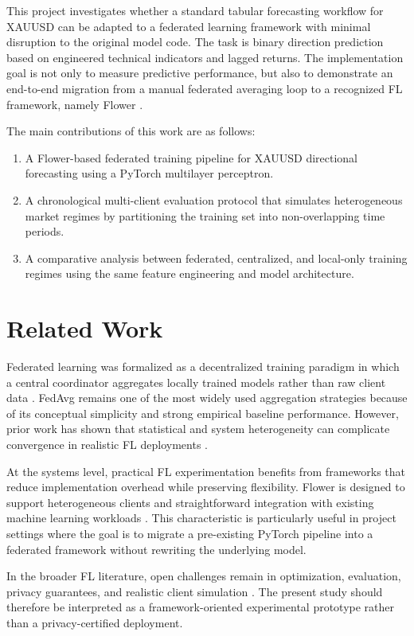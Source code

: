 \documentclass[conference]{IEEEtran}
\begin{document}
This project investigates whether a standard tabular forecasting workflow for XAUUSD can be adapted to a federated learning framework with minimal disruption to the original model code. The task is binary direction prediction based on engineered technical indicators and lagged returns. The implementation goal is not only to measure predictive performance, but also to demonstrate an end-to-end migration from a manual federated averaging loop to a recognized FL framework, namely Flower \cite{beutel2020}.

The main contributions of this work are as follows:
\begin{enumerate}
    \item A Flower-based federated training pipeline for XAUUSD directional forecasting using a PyTorch multilayer perceptron.
    \item A chronological multi-client evaluation protocol that simulates heterogeneous market regimes by partitioning the training set into non-overlapping time periods.
    \item A comparative analysis between federated, centralized, and local-only training regimes using the same feature engineering and model architecture.
\end{enumerate}

\section{Related Work}
Federated learning was formalized as a decentralized training paradigm in which a central coordinator aggregates locally trained models rather than raw client data \cite{mcmahan2017}. FedAvg remains one of the most widely used aggregation strategies because of its conceptual simplicity and strong empirical baseline performance. However, prior work has shown that statistical and system heterogeneity can complicate convergence in realistic FL deployments \cite{li2020}.

At the systems level, practical FL experimentation benefits from frameworks that reduce implementation overhead while preserving flexibility. Flower is designed to support heterogeneous clients and straightforward integration with existing machine learning workloads \cite{beutel2020}. This characteristic is particularly useful in project settings where the goal is to migrate a pre-existing PyTorch pipeline into a federated framework without rewriting the underlying model.

In the broader FL literature, open challenges remain in optimization, evaluation, privacy guarantees, and realistic client simulation \cite{kairouz2021}. The present study should therefore be interpreted as a framework-oriented experimental prototype rather than a privacy-certified deployment.
\end{document}
